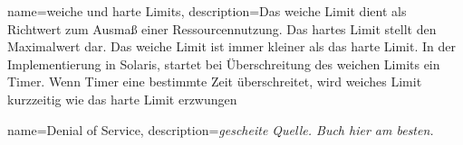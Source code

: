 {%
  name={weiche und harte Limits},
  description={Das weiche Limit dient als Richtwert zum Ausmaß einer Ressourcennutzung. Das hartes Limit stellt den Maximalwert dar. Das weiche Limit ist immer kleiner als das harte Limit. In der Implementierung in Solaris, startet bei Überschreitung des weichen Limits ein Timer. Wenn Timer eine bestimmte Zeit überschreitet, wird weiches Limit kurzzeitig wie das harte Limit erzwungen \cite{softHardLimits}}
}

{%
  name={Denial of Service},
  description={\emph{gescheite Quelle. Buch hier am besten.}}
}
